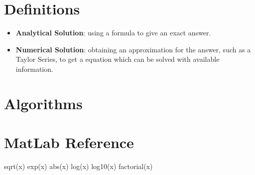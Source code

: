 \documentclass[fontsize=4pt]{scrartcl}
\begin{document}
\begin{multicols}{4}
\section{Definitions}

\parbox{\columnwidth}
{
  \begin{itemize}
    \item \textbf{Analytical Solution}: using a formula to give an exact answer.
    \item \textbf{Numerical Solution}: obtaining an approximation for the answer, 
          such as a Taylor Series, to get a equation which can be solved with available
          information.
  \end{itemize}
}

\columnbreak

\section{Algorithms}

\section{MatLab Reference}

  \begin{multicols}{3}
    sqrt(x)
    exp(x)
    abs(x) 
    log(x)
    log10(x)
    factorial(x)
  \end{multicols}

\end{multicols}
\end{document}
